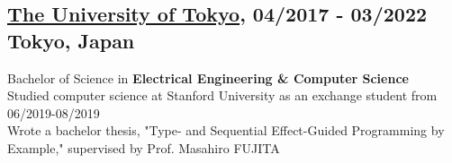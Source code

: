 \documentclass[10pt]{article}
\begin{document}
  \subsection*{\underline{The University of Tokyo}, 04/2017 -  03/2022 \hfill Tokyo, Japan}
    Bachelor of Science in \textbf{Electrical Engineering \& Computer Science}
    \\
    Studied computer science at Stanford University as an exchange student from 06/2019-08/2019
    \\
    Wrote a bachelor thesis, "Type- and Sequential Effect-Guided Programming by Example," supervised by Prof. Masahiro FUJITA
\end{document}
